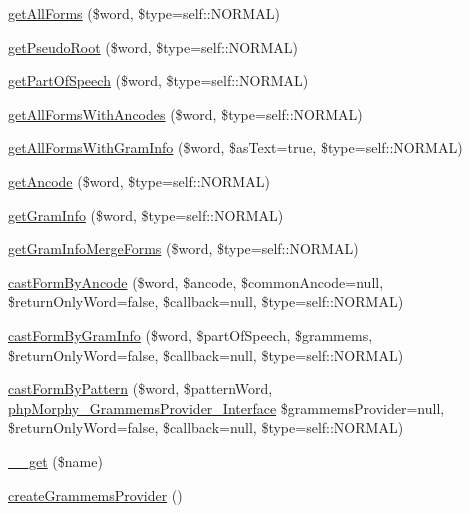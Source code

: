 \begin{DoxyCompactItemize}
\hyperlink{classphpMorphy_aa0aa63e9a5e213003fe83a34d5db7277}{getAllForms} (\$word, \$type=self::NORMAL)
\item 
\hyperlink{classphpMorphy_a71545506bc0c9601b1e5d7d416f22956}{getPseudoRoot} (\$word, \$type=self::NORMAL)
\item 
\hyperlink{classphpMorphy_a561c76269a2b81be6757a20511ee60fb}{getPartOfSpeech} (\$word, \$type=self::NORMAL)
\item 
\hyperlink{classphpMorphy_ab9bba681c54e6251b15844565de6f808}{getAllFormsWithAncodes} (\$word, \$type=self::NORMAL)
\item 
\hyperlink{classphpMorphy_afdc6eb10f33acccfef37b08512dde326}{getAllFormsWithGramInfo} (\$word, \$asText=true, \$type=self::NORMAL)
\item 
\hyperlink{classphpMorphy_a82b2c781e98354d08e213a91a3788e87}{getAncode} (\$word, \$type=self::NORMAL)
\item 
\hyperlink{classphpMorphy_ae69f1aa57ddaf885e08b9088829ba979}{getGramInfo} (\$word, \$type=self::NORMAL)
\item 
\hyperlink{classphpMorphy_a1330731d198f4aef740f8b1226faa848}{getGramInfoMergeForms} (\$word, \$type=self::NORMAL)
\item 
\hyperlink{classphpMorphy_a00000431efc09c2ccef96ee1318089c7}{castFormByAncode} (\$word, \$ancode, \$commonAncode=null, \$returnOnlyWord=false, \$callback=null, \$type=self::NORMAL)
\item 
\hyperlink{classphpMorphy_aafad3b0dee423fa155a896f046e87349}{castFormByGramInfo} (\$word, \$partOfSpeech, \$grammems, \$returnOnlyWord=false, \$callback=null, \$type=self::NORMAL)
\item 
\hyperlink{classphpMorphy_a5300845807b42f4a1d935a04faaf7f67}{castFormByPattern} (\$word, \$patternWord, \hyperlink{interfacephpMorphy__GrammemsProvider__Interface}{phpMorphy\_\-GrammemsProvider\_\-Interface} \$grammemsProvider=null, \$returnOnlyWord=false, \$callback=null, \$type=self::NORMAL)
\item 
\hyperlink{classphpMorphy_a8a676fab9cb0de61c9482f795eb38dea}{\_\-\_\-get} (\$name)
\item 
\hyperlink{classphpMorphy_a8ad51a075ccbc40baa9a5793a5d89125}{createGrammemsProvider} ()
\end{DoxyCompactItemize}
